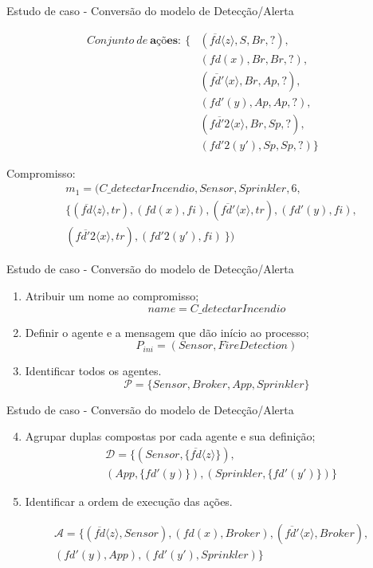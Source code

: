 \documentclass[12pt,xcolor={usenames,dvipsnames}]{beamer}
\begin{document}
\begin{frame}{Estudo de caso - Conversão do modelo de Detecção/Alerta}

\begin{eqnarray}
Conjunto~de~\textbf{ações}:~\{ &(\overline{fd}\langle z \rangle, S, Br, ?),& \nonumber \\
&(fd(x), Br, Br, ?),& \nonumber \\
&(\overline{fd'}\langle x \rangle, Br, Ap, ?),& \nonumber \\
&(fd'(y), Ap, Ap, ?),& \nonumber \\
&(\overline{fd'2}\langle x \rangle, Br, Sp, ?),& \nonumber \\
&(fd'2(y'), Sp, Sp, ?) \}& \nonumber 
\end{eqnarray}

Compromisso:
\begin{align}
& m_{1} = (C\_detectarIncendio, Sensor, Sprinkler, 6, \nonumber \\
& \{ (\overline{fd}\langle z \rangle, tr), (fd(x), fi), (\overline{fd'}\langle x \rangle, tr), (fd'(y), fi), \nonumber \\ &(\overline{fd'2}\langle x \rangle, tr), (fd'2(y'), fi)~\}) \nonumber
\end{align}

\end{frame}

\begin{frame}{Estudo de caso - Conversão do modelo de Detecção/Alerta}
	\begin{enumerate}
		\item Atribuir um nome ao compromisso;
		$$name = C\_detectarIncendio$$
		\item Definir o agente e a mensagem que dão início ao processo;
		$$P_{ini} = (Sensor, FireDetection)$$
		\item Identificar todos os agentes.
		$$\mathcal{P} = \{Sensor, Broker, App, Sprinkler\}$$
	\end{enumerate}
\end{frame}

\begin{frame}{Estudo de caso - Conversão do modelo de Detecção/Alerta}
\begin{enumerate}
	\setcounter{enumi}{3}
	\item Agrupar duplas compostas por cada agente e sua definição;
	\begin{align}
	&\mathcal{D} = \{(Sensor, \{\overline{fd}\langle z \rangle\}), \nonumber \\
	& (App, \{fd'(y)\}), (Sprinkler, \{fd'(y')\})\} \nonumber
	\end{align}
	\item Identificar a ordem de execução das ações.
\end{enumerate}
\begin{align}
&\mathcal{A} = \{(\overline{fd}\langle z \rangle, Sensor), (fd(x), Broker), (\overline{fd'}\langle x \rangle, Broker), \nonumber \\ 
&(fd'(y), App), (fd'(y'), Sprinkler)\} \nonumber
\end{align}
\end{frame}
\end{document}
